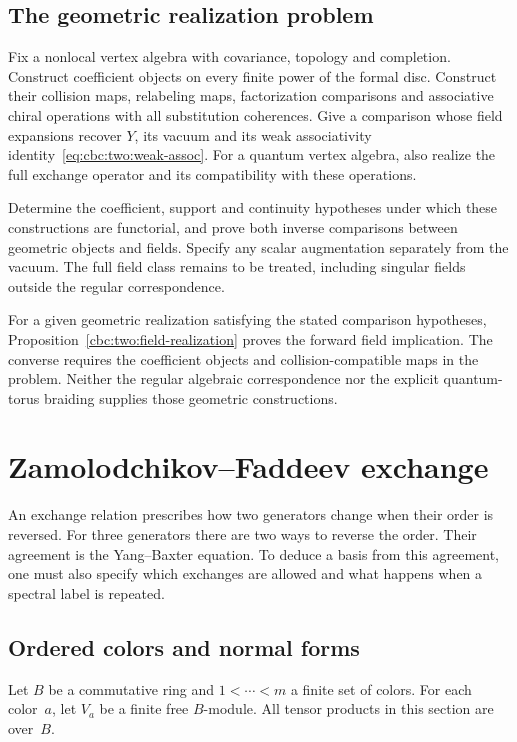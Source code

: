 \section{The geometric realization problem}

\begin{problem}\label{cbc:disc:realization}
Fix a nonlocal vertex algebra with covariance, topology and completion.
Construct coefficient objects on every finite power of the formal disc.
Construct their collision maps, relabeling maps, factorization comparisons and associative chiral operations with all substitution coherences.
Give a comparison whose field expansions recover $Y$, its vacuum and its weak associativity identity~\eqref{eq:cbc:two:weak-assoc}.
For a quantum vertex algebra, also realize the full exchange operator and its compatibility with these operations.

Determine the coefficient, support and continuity hypotheses under which these constructions are functorial, and prove both inverse comparisons between geometric objects and fields.
Specify any scalar augmentation separately from the vacuum.
The full field class remains to be treated, including singular fields outside the regular correspondence.
\end{problem}

For a given geometric realization satisfying the stated comparison hypotheses, Proposition~\ref{cbc:two:field-realization} proves the forward field implication.
The converse requires the coefficient objects and collision-compatible maps in the problem.
Neither the regular algebraic correspondence nor the explicit quantum-torus braiding supplies those geometric constructions.

\chapter{Zamolodchikov--Faddeev exchange}
\label{cbc:exchange:chapter}
An exchange relation prescribes how two generators change when their order is
reversed.  For three generators there are two ways to reverse the order.
Their agreement is the Yang--Baxter equation.  To deduce a basis from this
agreement, one must also specify which exchanges are allowed and what
happens when a spectral label is repeated.

\section{Ordered colors and normal forms}
Let $B$ be a commutative ring and $1<\cdots<m$ a finite set of colors.
For each color~$a$, let $V_a$ be a finite free $B$-module.
All tensor products in this section are over~$B$.

